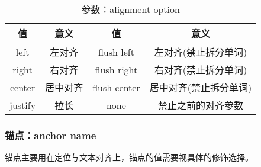 \begin{table}[H]
    \centering
    \caption{参数：alignment option}
    \label{table:alignment option}
    \setlength{\tabcolsep}{8mm}
    \begin{tabular}{c|cc|c}
        \toprule
        \textbf{值} & \textbf{意义} & \textbf{值} & \textbf{意义} \\
        \midrule
        left & 左对齐 & flush left & 左对齐(禁止拆分单词) \\
        right & 右对齐 & flush right & 右对齐(禁止拆分单词) \\
        center & 居中对齐 & flush center & 居中对齐(禁止拆分单词) \\
        justify & 拉长 & none & 禁止之前的对齐参数 \\
        \bottomrule
    \end{tabular}
\end{table}

\subsubsection{锚点：anchor name}

锚点主要用在定位与文本对齐上，锚点的值需要视具体的修饰选择。

